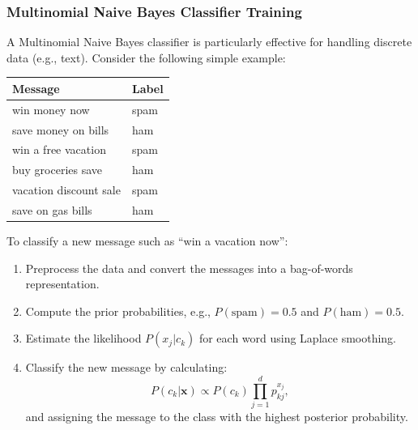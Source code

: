\documentclass[12pt]{article}
\begin{document}
\subsubsection{Multinomial Naive Bayes Classifier Training}
A Multinomial Naive Bayes classifier is particularly effective for handling discrete data (e.g., text). Consider the following simple example:
\begin{center}
\begin{tabular}{|l|l|}
\hline
Message & Label \\
\hline
win money now & spam \\
save money on bills & ham \\
win a free vacation & spam \\
buy groceries save & ham \\
vacation discount sale & spam \\
save on gas bills & ham \\
\hline
\end{tabular}
\end{center}
To classify a new message such as ``win a vacation now'':
\begin{enumerate}
    \item Preprocess the data and convert the messages into a bag-of-words representation.
    \item Compute the prior probabilities, e.g., \(P(\text{spam}) = 0.5\) and \(P(\text{ham}) = 0.5\).
    \item Estimate the likelihood \(P(x_j|c_k)\) for each word using Laplace smoothing.
    \item Classify the new message by calculating:
    $$
    P(c_k|\bm{x}) \propto P(c_k) \prod_{j=1}^{d} p_{kj}^{x_j},
    $$
    and assigning the message to the class with the highest posterior probability.
\end{enumerate}
\end{document}
